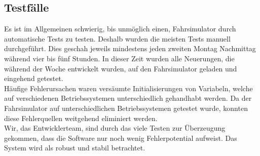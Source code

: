 \subsection{Testfälle}
Es ist im Allgemeinen schwierig, bis unmöglich einen, Fahrsimulator durch automatische Tests zu testen. Deshalb wurden die meisten Tests manuell durchgeführt. Dies geschah jeweils mindestens jeden zweiten Montag Nachmittag während vier bis fünf Stunden. In dieser Zeit wurden alle Neuerungen, die während der Woche entwickelt wurden, auf den Fahrsimulator geladen und eingehend getestet. \\
Häufige Fehlerursachen waren versäumte Initialisierungen von Variabeln, welche auf verschiedenen Betriebssystemen unterschiedlich gehandhabt werden. Da der Fahrsimulator auf unterschiedlichen Betriebssystemen getestet wurde, konnten diese Fehlerquellen weitgehend eliminiert werden. \\
Wir, das Entwicklerteam, sind durch das viele Testen zur Überzeugung gekommen, dass die Software nur noch wenig Fehlerpotential aufweist. Das System wird als robust und stabil betrachtet. 